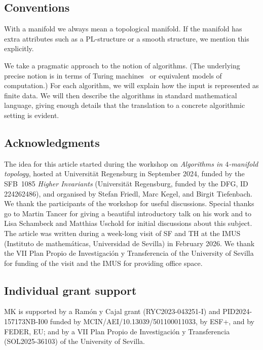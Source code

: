 \documentclass[a4paper, reqno]{amsart}
\theoremstyle{definition}
\theoremstyle{remark}
\newcommand{\comm}[2]{%
  {\color{red}#1: #2}}
\renewcommand{\~}{\nobreak\ }
\begin{document}
\subsection*{Conventions}
With a manifold we always mean a topological manifold. If the manifold has extra attributes such as a PL-structure or a smooth structure, we mention this explicitly.

We take a pragmatic approach to the notion of algorithms. (The underlying precise notion is in terms of Turing machines~\cite{boolos_burgess_jeffrey} or equivalent models of computation.) For each algorithm, we will explain how the input is represented as finite data. We will then describe the algorithms in standard mathematical language, giving enough details that the translation to a concrete algorithmic setting is evident.

\subsection*{Acknowledgments}
The idea for this article started during the workshop on \textit{Algorithms in $4$-manifold topology}, hosted at Universit\"at Regensburg in September 2024, funded by the SFB\~1085 \emph{Higher Invariants} (Universit\"at Regensburg, funded by the DFG, ID 224262486), and organised by Stefan Friedl, Marc Kegel, and Birgit Tiefenbach. We thank the participants of the workshop for useful discussions. Special thanks go to Martin Tancer for giving a beautiful introductory talk on his work \cite{Tancer} and to Lisa Schambeck and Matthias Uschold for initial discussions about this subject.
The article was written during a week-long visit of SF and TH at the IMUS (Instituto de mathemáticas, Universidad de Sevilla) in February 2026. We thank the VII Plan Propio de Investigación y Transferencia of the University of Sevilla for funding of the visit and the IMUS for providing office space.

\subsection*{Individual grant support}
MK is supported by a Ram\'on y Cajal grant \mbox{(RYC2023-043251-I)} and PID2024-157173NB-I00 funded by MCIN/AEI/10.13039/501100011033, by ESF+, and by FEDER, EU; and by a VII Plan Propio de Investigación y Transferencia (SOL2025-36103) of the University of Sevilla.
\end{document}
